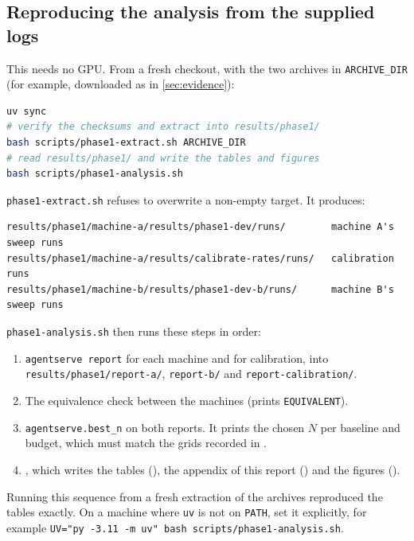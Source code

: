 \subsection{Reproducing the analysis from the supplied logs}\label{sec:repro-analysis}

This needs no GPU. From a fresh checkout, with the two archives in \texttt{ARCHIVE\_DIR} (for example, downloaded as in \cref{sec:evidence}):

\begin{lstlisting}[language=bash]
uv sync
# verify the checksums and extract into results/phase1/
bash scripts/phase1-extract.sh ARCHIVE_DIR
# read results/phase1/ and write the tables and figures
bash scripts/phase1-analysis.sh
\end{lstlisting}

\texttt{phase1-extract.sh} refuses to overwrite a non-empty target. It produces:

\begin{lstlisting}
results/phase1/machine-a/results/phase1-dev/runs/        machine A's sweep runs
results/phase1/machine-a/results/calibrate-rates/runs/   calibration runs
results/phase1/machine-b/results/phase1-dev-b/runs/      machine B's sweep runs
\end{lstlisting}

\texttt{phase1-analysis.sh} then runs these steps in order:
\begin{enumerate}
  \item \texttt{agentserve report} for each machine and for calibration, into \texttt{results/phase1/report-a/}, \texttt{report-b/} and \texttt{report-calibration/}.
  \item The equivalence check between the machines (prints \texttt{EQUIVALENT}).
  \item \texttt{agentserve.best\_n} on both reports. It prints the chosen $N$ per baseline and budget, which must match the grids recorded in .
  \item {}, which writes the tables (), the appendix of this report () and the figures ().
\end{enumerate}

Running this sequence from a fresh extraction of the archives reproduced the tables exactly. On a machine where \texttt{uv} is not on \texttt{PATH}, set it explicitly, for example \texttt{UV="py -3.11 -m uv" bash scripts/phase1-analysis.sh}.

